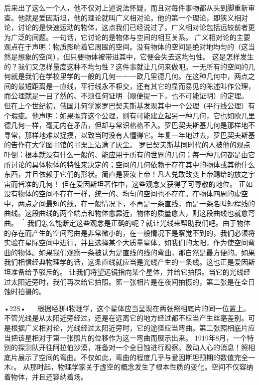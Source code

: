 后来出了这么一个人，他不仅对上述说法怀疑，而且对每件事物都从头到脚重新审查。他就是爱因斯坦，他的理论就叫广义相对论。他的第一个理论，即狭义相对论，讨论的是快速运动的物体，这点我们已经说过了。广义相对论包括远较前者更为广泛的间题。一句话，它讨论的是物体与空间的相互关系。
广义相对论的主要观点在于声明：物质影响着它周围的空间。没有物体的空间是绝对地均匀的（这当然是想象的空间），但只要物体被带进其中，它便会失去这均匀性。
这是怎样发生的？我们又怎样量度这种不均匀性？这件事就让几何来做吧。一无所有的空间的几何就是我们在学校里学的一般的几何一一一欧几里德几何。在这种几何中，两点之间的最短距离是一直线，平行线永不柜交，还有其它的显而易见的陈述叫作公理，而公理就是一目了然的、不须任何证明｛顺便提一下，也不可能证明）的定理。
但在上个世纪初，俄国儿何学家罗巴契夫斯基发现其中一个公理（平行线公理）有个瑕疵。他声明：如果抛弃这个公理，则有可能建立起另一种几何，它也如欧几里德几何一样，毫无内在矛盾，但却与常识格格不入。罗巴契夫斯基儿何是那样地不寻常，那样地难以捉摸，以致当时没有人懂得它。年复一年地过去，罗巴契夫斯基的告作在大学图书馆的书栗上沾满了灰尘。
罗巳契夫斯基同时代的人被他的观点吓倒：根本就没有什么一般的、能应用于所有的世界的几何；每一种几何都是由它所讨论的具体物体的特性来决定的；空间的几何依赖于存在其中的物体或其他什么东西，并且依赖于它们的形状。简直是亵汝上帝！凡人兑敢改变上帝赐给的放之宇宙而皆准的几何！
但在爱因斯坦著作中，这些观念又获得了可尊敬的地位。
正如没有物体的空间不存在一样，统一的、均匀的空间也不存在。在物体四周的虚空中，两点之间最短的线，在一般情况下，不再是一条直线，而是一条名叫短程线的曲线。这段曲线的两个端点和物体愈靠近，物体的质量愈大，则这段曲线也就愈弯曲。
｀我们怎么能断定这些观念是正确的呢？就让光线来帮助我们吧。由于物体的存在而产生的空间弯曲是非常微小的，在一般情况下是察觉不到的，我们必须将实验在星际空间中进行，并且选择某个大质量星体，如我们的太阳，作为使空间弯曲的物体。如果我们观察一条被认为是直线的线的弯曲，那自然是最方便的。如果我们相信经典物理学的话，这条直线就应当是光线产生的一条线。这也正是爱因斯坦准备给予驳斥的。
让我们将望远镜指向某个星体，并给它拍照。当它的光线经过太阳近旁时，我们再次给它拍照。笫一张相片是在夜间拍摄的，第二张是在全日蚀时拍摄的。

•22S•
  
根据经骈4物理学，这个星体应当呈现在两张照相底片的同一位置上。不管光线是从太阳近旁经过，还是在远离它的地方经过都不应当产生丝亳差别。可是根据广义相对论，光线经过太阳近旁时，它的途径应当弯曲。第二张照相底片应当把该星相对于第一张照片的位移作为这一弯曲而展示出来。
1919年8月，一个特别的探测队开往阿拉伯沙漠，准备对一个全日蚀进行观察。激动人心的消息！照相底片展示了空间的弯曲。不仅如此，弯曲的程度几乎与爱因斯坦预期的数值完全一木r。
从那时起，物理学家关于虚空的概念发生了根本性质的变化。空间不仅容纳着物体，并且还容纳着场。

